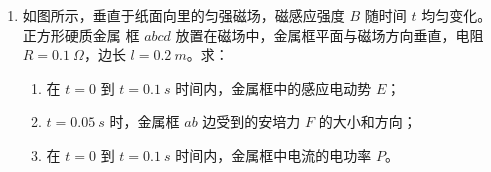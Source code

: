 \begin{enumerate}
\gaokaojs

\item
如图所示，垂直于纸面向里的匀强磁场，磁感应强度 $ B $ 随时间 $ t $ 均匀变化。正方形硬质金属
框 $ abcd $ 放置在磁场中，金属框平面与磁场方向垂直，电阻 $ R=0.1 \ \Omega $，边长 $ l=0.2 \ m $。求：
\begin{enumerate}
\item
在 $ t=0 $ 到 $ t=0.1 \ s $ 时间内，金属框中的感应电动势 $ E $；
\item 
$ t=0.05 \ s $ 时，金属框 $ ab $ 边受到的安培力 $ F $ 的大小和方向；
\item 
在 $ t=0 $ 到 $ t=0.1 \ s $ 时间内，金属框中电流的电功率 $ P $。

\end{enumerate}
\begin{figure}[h!]
\flushright
\begin{subfigure}{0.4\linewidth}
\centering
 
\caption{}\label{}
\end{subfigure}
\begin{subfigure}{0.4\linewidth}
\centering
 
\caption{}\label{}
\end{subfigure}
\end{figure}







\end{enumerate}
